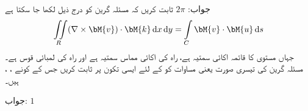 جواب:\quad
$2\pi$
ثابت کریں کہ مسئلہ گرین کو درج ذیل لکھا جا سکتا ہے
\begin{align}\label{مساوات_خطی_تکمل_مسئلہ_گرین_تیسری_صورت}
\iint\limits_R (\nabla \times \bM{v}) \cdot \bM{k}\dif x\dif y=\int\limits_C \bM{v}\cdot \bM{u}\dif s
\end{align}
جہاں  مستوی  کا قائمہ اکائی سمتیہ ہے،  راہ  کی اکائی مماس سمتیہ ہے اور  راہ  کی لمبائی قوس ہے۔
مسئلہ گرین کی تیسری صورت یعنی مساوات  کو  کے لئے ایسی تکون پر ثابت کریں جس کے کونے ، ،  ہیں۔

جواب:\quad
$1$


